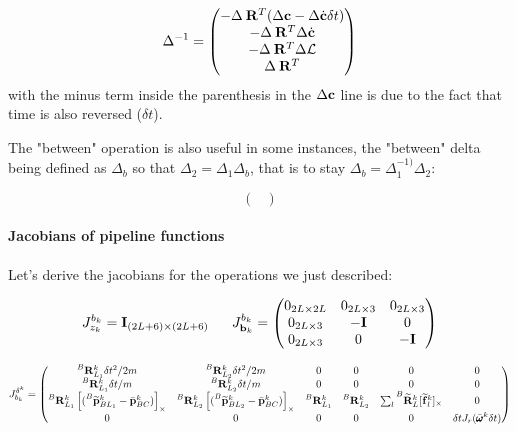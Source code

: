 \documentclass[11pt]{article}
\newcommand{\Rot}[2]{\prescript{#1}{}{\bfR}_{#2}}
\newcommand{\Rotm}[2]{\prescript{#1}{}{\widetilde{\bfR}}_{#2}}
\newcommand{\bias}{\bfb}
\newcommand{\posim}[2]{\prescript{#1}{}{\widetilde{\bfp}}_{#2}}
\newcommand{\posibar}{\bar{\bfp}}
\newcommand{\angvelbar}{\bar{\pmb{\omega}}}
\newcommand{\forcem}[2]{\prescript{#1}{}{\widetilde{\bff}}_{#2}}
\newcommand{\AM}{\mathcal{L}}
\newcommand{\COM}{\bfc}
\newcommand{\COMd}{\dot{\bfc}}
\newcommand{\Ident}{\bfI}
\begin{document}
\begin{equation}
	\Delta^{-1} =
	\begin{pmatrix}
	 - \Delta \Rot{}{}^T (\Delta\COM - \Delta\COMd \delta t)
	 \\
	 - \Delta \Rot{}{}^T \Delta \COMd
	 \\
	 - \Delta \Rot{}{}^T \Delta\AM
	 \\
	 \Delta \Rot{}{}^T
	\end{pmatrix}
\end{equation}
with the minus term inside the parenthesis in the $\Delta\COM$ line is due to the fact that time is also reversed ($\delta t$).

The "between" operation is also useful in some instances, the "between" delta being defined as $\Delta_b$ so that $\Delta_2 = \Delta_1 \Delta_b$, that is to stay $\Delta_b = \Delta^{-1)}_1 \Delta_2$:

\begin{equation}
	\begin{pmatrix}
	
	\end{pmatrix}
\end{equation}

\paragraph{Jacobians of pipeline functions}
Let's derive the jacobians for the operations we just described:

\begin{equation}
    J^{b_k}_{z_k} = \Ident_{(2L+6)\times (2L+6)}
    ~~~~~
    J^{b_k}_{\bias_k} =
    \begin{pmatrix}
    0_{2L\times 2L} & 0_{2L\times 3} & 0_{2L\times 3}
    \\
    0_{2L\times 3} & -\Ident & 0
    \\
    0_{2L\times 3} & 0 & -\Ident
    \end{pmatrix}
\end{equation}

\begin{equation}
J^{\delta ^k}_{b_k} =
\begin{pmatrix}
    \Rot{B}{L_1}^k \delta t^2/2m & \Rot{B}{L_2}^k \delta t^2/2m & 0 & 0 & 0 & 0 
    \\
    \Rot{B}{L_1}^k \delta t/m & \Rot{B}{L_2}^k \delta t/m & 0 & 0 & 0 & 0  
    \\
    \Rot{B}{L_1}^k\left[(\posim{B}{BL_1}^k - \posibar_{BC}^k) \right]_{\times} & \Rot{B}{L_2}^k\left[(\posim{B}{BL_2}^k - \posibar_{BC}^k) \right]_{\times} & \Rot{B}{L_1}^k &  \Rot{B}{L_2}^k & \sum_{l} \Rotm{B}{L}^k [\forcem{}{l}^k]_{\times} & 0 
    \\
    0 & 0 & 0 & 0 & 0 & \delta t J_r (\angvelbar^k \delta t)
\end{pmatrix}
\end{equation}
\end{document}
